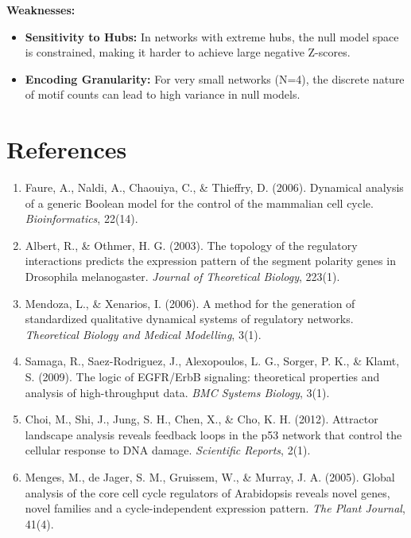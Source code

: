 \textbf{Weaknesses:}
\begin{itemize}
    \item \textbf{Sensitivity to Hubs:} In networks with extreme hubs, the null model space is constrained, making it harder to achieve large negative Z-scores.
    \item \textbf{Encoding Granularity:} For very small networks (N=4), the discrete nature of motif counts can lead to high variance in null models.
\end{itemize}

\section{References}
\begin{enumerate}
    \item Faure, A., Naldi, A., Chaouiya, C., \& Thieffry, D. (2006). Dynamical analysis of a generic Boolean model for the control of the mammalian cell cycle. \textit{Bioinformatics}, 22(14).
    \item Albert, R., \& Othmer, H. G. (2003). The topology of the regulatory interactions predicts the expression pattern of the segment polarity genes in Drosophila melanogaster. \textit{Journal of Theoretical Biology}, 223(1).
    \item Mendoza, L., \& Xenarios, I. (2006). A method for the generation of standardized qualitative dynamical systems of regulatory networks. \textit{Theoretical Biology and Medical Modelling}, 3(1).
    \item Samaga, R., Saez-Rodriguez, J., Alexopoulos, L. G., Sorger, P. K., \& Klamt, S. (2009). The logic of EGFR/ErbB signaling: theoretical properties and analysis of high-throughput data. \textit{BMC Systems Biology}, 3(1).
    \item Choi, M., Shi, J., Jung, S. H., Chen, X., \& Cho, K. H. (2012). Attractor landscape analysis reveals feedback loops in the p53 network that control the cellular response to DNA damage. \textit{Scientific Reports}, 2(1).
    \item Menges, M., de Jager, S. M., Gruissem, W., \& Murray, J. A. (2005). Global analysis of the core cell cycle regulators of Arabidopsis reveals novel genes, novel families and a cycle-independent expression pattern. \textit{The Plant Journal}, 41(4).
\end{enumerate}

